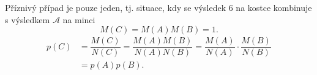 \begin{mdframed}[style=mdexam]
\begin{example}
    Příznivý případ je pouze jeden, tj. situace, kdy se výsledek \num{6} na kostce kombinuje s
    výsledkem \(\mathcal{A}\) na minci    
    \begin{equation*}
      M(C) = M(A)M(B) = 1.
    \end{equation*}
    \begin{align*}
      p(C) &= \dfrac{M(C)}{N(C)} = \dfrac{M(A)M(B)}{N(A)N(B)} 
            = \dfrac{M(A)}{N(A)}\cdot\dfrac{M(B)}{N(B)}                            \\
           &= p(A)p(B).
    \end{align*}
  \end{example}
\end{mdframed}